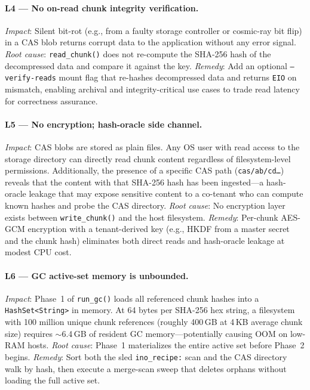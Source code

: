 \documentclass[journal]{IEEEtran}
\begin{document}
\paragraph{L4 — No on-read chunk integrity verification.}
\textit{Impact}: Silent bit-rot (e.g., from a faulty storage controller or
cosmic-ray bit flip) in a CAS blob returns corrupt data to the application
without any error signal.  \textit{Root cause}: \texttt{read\_chunk()}
does not re-compute the SHA-256 hash of the decompressed data and compare
it against the key.  \textit{Remedy}: Add an optional
\texttt{--verify-reads} mount flag that re-hashes decompressed data and
returns \texttt{EIO} on mismatch, enabling archival and integrity-critical
use cases to trade read latency for correctness assurance.

\paragraph{L5 — No encryption; hash-oracle side channel.}
\textit{Impact}: CAS blobs are stored as plain files.  Any OS user
with read access to the storage directory can directly read chunk content
regardless of filesystem-level permissions.  Additionally, the presence
of a specific CAS path (\texttt{cas/ab/cd\ldots}) reveals that the
content with that SHA-256 hash has been ingested---a hash-oracle leakage
that may expose sensitive content to a co-tenant who can compute known
hashes and probe the CAS directory.  \textit{Root cause}: No encryption
layer exists between \texttt{write\_chunk()} and the host filesystem.
\textit{Remedy}: Per-chunk AES-GCM encryption with a tenant-derived key
(e.g., HKDF from a master secret and the chunk hash) eliminates both
direct reads and hash-oracle leakage at modest CPU cost.

\paragraph{L6 — GC active-set memory is unbounded.}
\textit{Impact}: Phase~1 of \texttt{run\_gc()} loads all referenced
chunk hashes into a \texttt{HashSet\textless{}String\textgreater{}} in
memory.  At 64 bytes per SHA-256 hex string, a filesystem with 100
million unique chunk references (roughly 400\,GB at 4\,KB average chunk
size) requires $\sim$6.4\,GB of resident GC memory---potentially causing
OOM on low-RAM hosts.  \textit{Root cause}: Phase~1 materializes the
entire active set before Phase~2 begins.  \textit{Remedy}: Sort both
the sled \texttt{ino\_recipe:} scan and the CAS directory walk by hash,
then execute a merge-scan sweep that deletes orphans without loading the
full active set.
\end{document}
